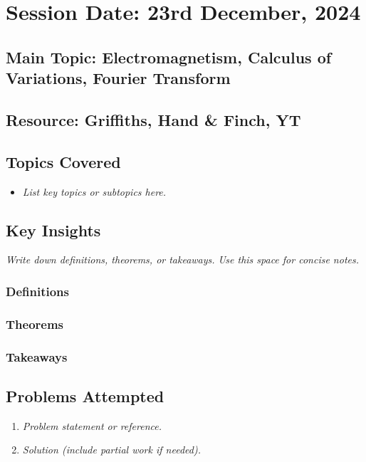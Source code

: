 \section{Session Date: 23rd December, 2024}
\subsection*{Main Topic: Electromagnetism, Calculus of Variations, Fourier Transform}
\subsection*{Resource: Griffiths, Hand \& Finch, YT}
\subsection*{Topics Covered}
\begin{itemize}
    \item \textit{List key topics or subtopics here.} 
\end{itemize}

\subsection*{Key Insights}
\textit{Write down definitions, theorems, or takeaways. Use this space for concise notes.}
\subsubsection*{Definitions} 
\subsubsection*{Theorems}
\subsubsection*{Takeaways}

\subsection*{Problems Attempted}
\begin{enumerate}
    \item \textit{Problem statement or reference.}
    \item \textit{Solution (include partial work if needed).}
\end{enumerate}

